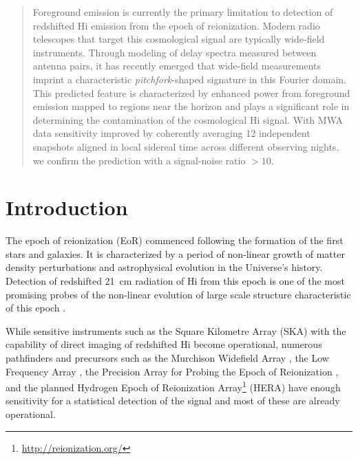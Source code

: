 \documentclass[preprint2,apjl,numberedappendix,twocolappendix,appendixfloats]{emulateapj}
\begin{document}

\begin{abstract}

Foreground emission is currently the primary limitation to detection of redshifted H{\sc i} emission from the epoch of reionization. Modern radio telescopes that target this cosmological signal are typically wide-field instruments. Through modeling of delay spectra measured between antenna pairs, it has recently emerged that wide-field measurements imprint a characteristic {\it pitchfork}-shaped signature in this Fourier domain. This predicted feature is characterized by enhanced power from foreground emission mapped to regions near the horizon and plays a significant role in determining the contamination of the cosmological H{\sc i} signal. With MWA data sensitivity improved by coherently averaging 12 independent snapshots aligned in local sidereal time across different observing nights, we confirm the prediction with a signal-noise ratio $>10$.

\end{abstract}
 

\section{Introduction}\label{sec:intro}

The epoch of reionization (EoR) commenced following the formation of the first stars and galaxies. It is characterized by a period of non-linear growth of matter density perturbations and astrophysical evolution in the Universe's history. Detection of redshifted 21~cm radiation of H{\sc i} from this epoch is one of the most promising probes of the non-linear evolution of large scale structure characteristic of this epoch \citep{sun72,sco90,mad97,toz00,ili02}.

While sensitive instruments such as the Square Kilometre Array (SKA) with the capability of direct imaging of redshifted H{\sc i} become operational, numerous pathfinders and precursors such as the Murchison Widefield Array \citep[MWA;][]{lon09,tin13,bow13}, the Low Frequency Array \citep[LOFAR;][]{van13}, the Precision Array for Probing the Epoch of Reionization \citep[PAPER;][]{par10}, and the planned Hydrogen Epoch of Reionization Array\footnote{\url{http://reionization.org/}} (HERA) have enough sensitivity for a statistical detection of the signal \citep{bow06,par12a,bea13,dil13,thy13,pob14} and most of these are already operational.
\end{document}
